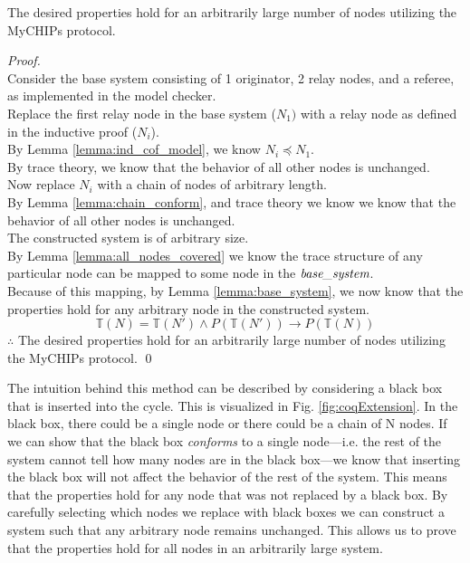 \documentclass[runningheads]{llncs}
\newcommand{\basesystem}{\emph{base\_system}}
\newcommand{\tracestruc}[1]{\mathds{T}(#1)}
\begin{document}
\begin{theorem}
The desired properties hold for an arbitrarily large number of nodes utilizing the MyCHIPs protocol.
\begin{proof}\
\\
Consider the base system consisting of 1 originator, 2 relay nodes, and a referee, as implemented in the model checker. \\
Replace the first relay node in the base system ($N_1) $ with a relay node as defined in the inductive proof ($N_i$). \\
By Lemma \ref{lemma:ind_cof_model}, we know $N_i \preceq N_1$. \\
By trace theory, we know that the behavior of all other nodes is unchanged. \\
Now replace $N_i$ with a chain of nodes of arbitrary length. \\
By Lemma \ref{lemma:chain_conform}, and trace theory we know we know that the behavior of all other nodes is unchanged. \\
The constructed system is of arbitrary size. \\
By Lemma \ref{lemma:all_nodes_covered} we know the trace structure of any particular node can be mapped to some node in the $\basesystem$.  \\
Because of this mapping, by Lemma \ref{lemma:base_system}, we now know that the properties hold for any arbitrary node in the constructed system. \\
$$\tracestruc{N} = \tracestruc{N'} \wedge P(\tracestruc{N'}) \longrightarrow P(\tracestruc{N})$$
$\therefore$ The desired properties hold for an arbitrarily large number of nodes utilizing the MyCHIPs protocol.
\qed
\end{proof}
\end{theorem}

The intuition behind this method can be described by considering a black box that is inserted into the cycle. This is visualized in Fig. \ref{fig:coqExtension}. In the black box, there could be a single node or there could be a chain of N nodes. If we can show that the black box \emph{conforms} to a single node---i.e. the rest of the system cannot tell how many nodes are in the black box---we know that inserting the black box will not affect the behavior of the rest of the system. This means that the properties hold for any node that was not replaced by a black box. By carefully selecting which nodes we replace with black boxes we can construct a system such that any arbitrary node remains unchanged. This allows us to prove that the properties hold for all nodes in an arbitrarily large system. 
\end{document}
